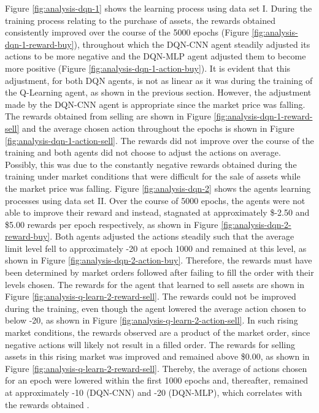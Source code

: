 Figure \ref{fig:analysis-dqn-1} shows the learning process using data set I.
During the training process relating to the purchase of assets, the rewards obtained consistently improved over the course of the 5000 epochs (Figure \ref{fig:analysis-dqn-1-reward-buy}), throughout which the DQN-CNN agent steadily adjusted its actions to be more negative and the DQN-MLP agent adjusted them to become more positive (Figure \ref{fig:analysis-dqn-1-action-buy}).
It is evident that this adjustment, for both DQN agents, is not as linear as it was during the training of the Q-Learning agent, as shown in the previous section.
However, the adjustment made by the DQN-CNN agent is appropriate since the market price was falling.
The rewards obtained from selling are shown in Figure \ref{fig:analysis-dqn-1-reward-sell} and the average chosen action throughout the epochs is shown in Figure \ref{fig:analysis-dqn-1-action-sell}.
The rewards did not improve over the course of the training and both agents did not choose to adjust the actions on average.
Possibly, this was due to the constantly negative rewards obtained during the training under market conditions that were difficult for the sale of assets while the market price was falling.
Figure \ref{fig:analysis-dqn-2} shows the agents learning processes using data set II.
Over the course of 5000 epochs, the agents were not able to improve their reward and instead, stagnated at approximately \$-2.50 and \$5.00 rewards per epoch respectively, as shown in Figure \ref{fig:analysis-dqn-2-reward-buy}.
Both agents adjusted the actions steadily such that the average limit level fell to approximately -20 at epoch 1000 and remained at this level, as shown in Figure \ref{fig:analysis-dqn-2-action-buy}.
Therefore, the rewards must have been determined by market orders followed after failing to fill the order with their levels chosen.
The rewards for the agent that learned to sell assets are shown in Figure \ref{fig:analysis-q-learn-2-reward-sell}.
The rewards could not be improved during the training, even though the agent lowered the average action chosen to below -20, as shown in Figure \ref{fig:analysis-q-learn-2-action-sell}.
In such rising market conditions, the rewards observed are a product of the market order, since negative actions will likely not result in a filled order.
The rewards for selling assets in this rising market was improved and remained above \$0.00, as shown in Figure \ref{fig:analysis-q-learn-2-reward-sell}.
Thereby, the average of actions chosen for an epoch were lowered within the first 1000 epochs and, thereafter, remained at approximately -10 (DQN-CNN) and -20 (DQN-MLP), which correlates with the rewards obtained .
